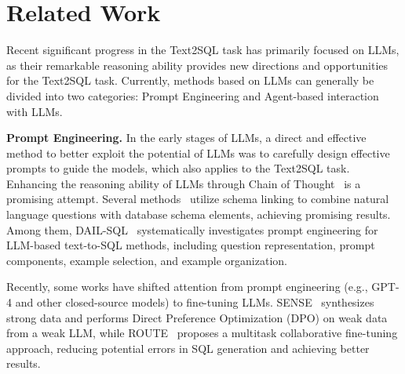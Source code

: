 \section{Related Work}
Recent significant progress in the Text2SQL task has primarily focused on LLMs, as their remarkable reasoning ability provides new directions and opportunities for the Text2SQL task. Currently, methods based on LLMs can generally be divided into two categories: Prompt Engineering and Agent-based interaction with LLMs.



\noindent \textbf{Prompt Engineering.}
In the early stages of LLMs, a direct and effective method to better exploit the potential of LLMs was to carefully design effective prompts to guide the models, which also applies to the Text2SQL task. Enhancing the reasoning ability of LLMs through Chain of Thought~\cite{DBLP:conf/emnlp/ZhangCCX023} is a promising attempt. Several methods~\cite{wang2024macsql, DBLP:conf/nips/PourrezaR23, DBLP:journals/pacmmod/LiZLFZZWP0024} utilize schema linking to combine natural language questions with database schema elements, achieving promising results. Among them, DAIL-SQL~\cite{DBLP:journals/pvldb/GaoWLSQDZ24} systematically investigates prompt engineering for LLM-based text-to-SQL methods, including question representation, prompt components, example selection, and example organization. 

Recently, some works have shifted attention from prompt engineering (e.g., GPT-4 and other closed-source models) to fine-tuning LLMs. SENSE~\cite{yang-etal-2024-synthesizing} synthesizes strong data and performs Direct Preference Optimization (DPO) on weak data from a weak LLM, while ROUTE~\cite{qin2024route} proposes a multitask collaborative fine-tuning approach, reducing potential errors in SQL generation and achieving better results.


